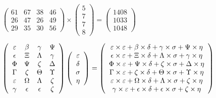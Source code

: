 \documentclass[12pt]{article}
\begin{document}
 
 
\noindent{}
 
 

 
$\left( \begin{array}{ccccccccccccccc}
 61  & 
 67  & 
 38  & 
 46  \\ 
 26  & 
 47  & 
 26  & 
 49  \\ 
 29  & 
 35  & 
 30  & 
 56
\end{array}\right) \times
\left( \begin{array}{c}
 5  \\ 
 7  \\ 
 7  \\ 
 8
\end{array}\right)  =
\left( \begin{array}{c}
 1408  \\ 
 1033  \\ 
 1048
\end{array}\right)  $
 
$  %
 \left( \begin{array}
 {
 c
 c
 c
 c
 }
 \varepsilon & 
 \beta & 
 \gamma & 
 \Psi \\ 
 \epsilon & 
                    \Xi & 
 \Lambda & 
 \gamma \\ 
 \Phi & 
 \Psi & 
                    \zeta & 
 \Delta \\ 
 \Gamma & 
                    \zeta & 
 \Theta & 
 \Upsilon \\ 
 \varepsilon & 
 \Omega & 
 \Lambda & 
                    \zeta \\ 
 \gamma & 
 \epsilon & 
 \epsilon & 
                    \zeta
 \end{array} \right)
 \left( \begin{array}
 {
 c
 }
 \varepsilon \\ 
 \delta \\ 
 \sigma \\ 
 \eta
 \end{array} \right)
=
  \left( \begin{array}
 {
 c
 }
 \varepsilon \times  \varepsilon   +  \beta \times  \delta   +  \gamma \times  \sigma   +  \Psi \times  \eta \\ 
 \epsilon \times  \varepsilon   +                     \Xi \times  \delta   +  \Lambda \times  \sigma   +  \gamma \times  \eta \\ 
 \Phi \times  \varepsilon   +  \Psi \times  \delta   +                     \zeta \times  \sigma   +  \Delta \times  \eta \\ 
 \Gamma \times  \varepsilon   +                     \zeta \times  \delta   +  \Theta \times  \sigma   +  \Upsilon \times  \eta \\ 
 \varepsilon \times  \varepsilon   +  \Omega \times  \delta   +  \Lambda \times  \sigma   +                     \zeta \times  \eta \\ 
 \gamma \times  \varepsilon   +  \epsilon \times  \delta   +  \epsilon \times  \sigma   +                     \zeta \times  \eta
 \end{array} \right)
$
 
\end{document}
